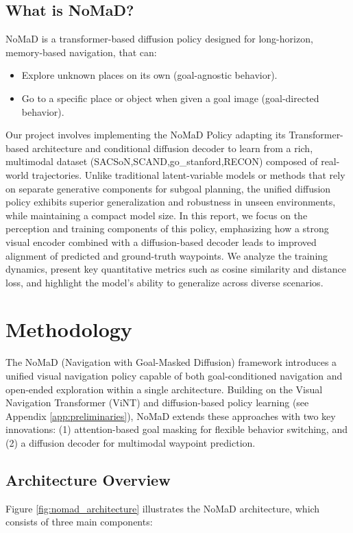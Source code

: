 \documentclass[12pt]{article}
\begin{document}
\subsection*{What is NoMaD?}
NoMaD is a transformer-based diffusion policy designed for long-horizon, memory-based navigation, that can:
\begin{itemize}
    \item Explore unknown places on its own (goal-agnostic behavior).
    \item Go to a specific place or object when given a goal image (goal-directed behavior).
\end{itemize}
Our project involves implementing the NoMaD Policy adapting its Transformer-based architecture and conditional diffusion decoder
to learn from a rich, multimodal dataset (SACSoN,SCAND,go\_stanford,RECON) composed of real-world trajectories.
Unlike traditional latent-variable models or methods that rely on separate generative components for subgoal planning, the unified diffusion policy exhibits superior generalization and robustness in unseen environments, while maintaining a compact model size.
In this report, we focus on the perception and training components of this policy, emphasizing how a strong visual encoder combined with a diffusion-based decoder leads to improved alignment of predicted and ground-truth waypoints. We analyze the training dynamics, present key quantitative metrics such as cosine similarity and distance loss, and highlight the model's ability to generalize across diverse scenarios.

\section{Methodology}
The NoMaD (Navigation with Goal-Masked Diffusion) framework introduces a unified visual navigation policy capable of both goal-conditioned navigation and open-ended exploration within a single architecture. Building on the Visual Navigation Transformer (ViNT) \cite{vint_paper} and diffusion-based policy learning (see Appendix \ref{app:preliminaries}), NoMaD extends these approaches with two key innovations: (1) attention-based goal masking for flexible behavior switching, and (2) a diffusion decoder for multimodal waypoint prediction.
\subsection*{Architecture Overview}
\label{subsec:architecture}
Figure \ref{fig:nomad_architecture} illustrates the NoMaD architecture, which consists of three main components:
\end{document}
